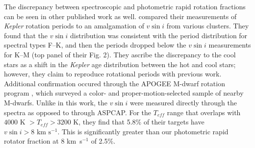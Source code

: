 \documentclass[manuscript]{aastex6}
\newcommand{\vsini}{\ensuremath{v \sin i}}
\newcommand{\Kepler}{\mbox{\textit{Kepler}}}
\newcommand{\Teff}{\ensuremath{T_{eff}}}
\newcommand{\kms}{\textrm{ km~s}\ensuremath{^{-1}}}
\begin{document}
The discrepancy between spectroscopic and 
photometric rapid rotation fractions can be seen in other published work as well. 
\citet{Nielsen13} compared their measurements of \Kepler{} rotation periods to
an amalgamation of \vsini{} from various clusters. They found that the
\vsini{} distribution was consistent with the period distribution for spectral
types F--K, and then the periods dropped below the \vsini{} measurements for
K--M (top panel of their Fig. 2). They ascribe the discrepancy to the cool
stars as a shift in the \Kepler{} age distribution between the hot and cool
stars; however, they claim to reproduce rotational periods with previous work. 
Additional confirmation occured through the APOGEE M-dwarf rotation
program \citep{Gilhool18}, which surveyed a color- and proper-motion-selected 
sample of nearby M-dwarfs. Unlike in this work, the \vsini{} were measured 
directly through the spectra as opposed to through ASPCAP\@. For the \Teff{} range that
overlaps with \citet{McQuillan14} \(4000 \textrm{ K } > \Teff > 3200\) K, they 
find that 5.8\% of their targets have \(\vsini > 8 \kms\). This is 
significantly greater than our photometric rapid rotator fraction at 8 \kms{} 
of 2.5\%. 
\end{document}

